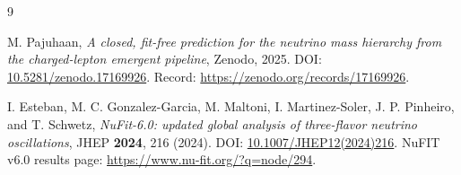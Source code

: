 \documentclass[11pt]{article}
\begin{document}
\begin{thebibliography}{9}

M. Pajuhaan,
\emph{A closed, fit-free prediction for the neutrino mass hierarchy from the
charged-lepton emergent pipeline},
Zenodo, 2025.
DOI: \href{https://doi.org/10.5281/zenodo.17169926}{10.5281/zenodo.17169926}.
Record: \url{https://zenodo.org/records/17169926}.

I. Esteban, M. C. Gonzalez-Garcia, M. Maltoni, I. Martinez-Soler,
J. P. Pinheiro, and T. Schwetz,
\emph{NuFit-6.0: updated global analysis of three-flavor neutrino oscillations},
JHEP \textbf{2024}, 216 (2024).
DOI: \href{https://doi.org/10.1007/JHEP12(2024)216}
{10.1007/JHEP12(2024)216}.
NuFIT v6.0 results page:
\url{https://www.nu-fit.org/?q=node/294}.

\end{thebibliography}
\end{document}
